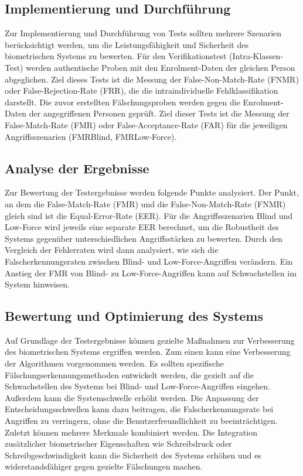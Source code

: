 \documentclass{article}
\begin{document}
\subsection{Implementierung und Durchführung}

Zur Implementierung und Durchführung von Tests sollten mehrere Szenarien berücksichtigt werden, um die Leistungsfähigkeit
und Sicherheit des biometrischen Systems zu bewerten. Für den Verifikationstest (Intra-Klassen-Test) werden
authentische Proben mit den Enrolment-Daten der gleichen Person abgeglichen. Ziel dieses Tests ist die Messung
der False-Non-Match-Rate (FNMR) oder False-Rejection-Rate (FRR), die die intraindividuelle Fehlklassifikation darstellt.
Die zuvor erstellten Fälschungsproben werden gegen die Enrolment-Daten der angegriffenen Personen geprüft. Ziel
dieser Tests ist die Messung der False-Match-Rate (FMR) oder False-Acceptance-Rate (FAR) für die jeweiligen
Angriffsszenarien (FMRBlind, FMRLow-Force).

\subsection{Analyse der Ergebnisse}

Zur Bewertung der Testergebnisse werden folgende Punkte analysiert. Der Punkt, an dem die False-Match-Rate 
(FMR) und die False-Non-Match-Rate (FNMR) gleich sind ist die Equal-Error-Rate (EER). Für die 
Angriffsszenarien Blind und Low-Force wird jeweils eine separate EER berechnet, um die Robustheit des 
Systems gegenüber unterschiedlichen Angriffsstärken zu bewerten. Durch den Vergleich der Fehlerraten wird 
dann analysiert, wie sich die Falscherkennungsraten zwischen Blind- und Low-Force-Angriffen verändern. Ein 
Anstieg der FMR von Blind- zu Low-Force-Angriffen kann auf Schwachstellen im System hinweisen. 

\subsection{Bewertung und Optimierung des Systems}

Auf Grundlage der Testergebnisse können gezielte Maßnahmen zur Verbesserung des biometrischen Systems 
ergriffen werden. Zum einen kann eine Verbesserung der Algorithmen vorgenommen werden. Es sollten 
spezifische Fälschungserkennungsmethoden entwickelt werden, die gezielt auf die Schwachstellen des Systems 
bei Blind- und Low-Force-Angriffen eingehen. Außerdem kann die Systemschwelle erhöht werden. Die Anpassung 
der Entscheidungsschwellen kann dazu beitragen, die Falscherkennungsrate bei Angriffen zu verringern, ohne 
die Benutzerfreundlichkeit zu beeinträchtigen. Zuletzt können mehrere Merkmale kombiniert werden. Die 
Integration zusätzlicher biometrischer Eigenschaften wie Schreibdruck oder Schreibgeschwindigkeit kann die 
Sicherheit des Systems erhöhen und es widerstandsfähiger gegen gezielte Fälschungen machen.
\end{document}
